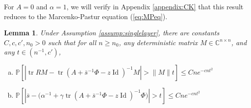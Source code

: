 \documentclass{article}
\newtheorem{lemma}[theorem]{Lemma}
\theoremstyle{definition}
\newcommand{\C}{\mathbb{C}}
\newcommand{\Id}{\operatorname{Id}}
\newcommand{\tr}{\operatorname{tr}}
\renewcommand{\P}{\mathbb{P}}
\newcommand{\1}{\mathbf{1}}
\begin{document}
For $A=0$ and $\alpha=1$, we will verify in Appendix \ref{appendix:CK}
that this result reduces to the Marcenko-Pastur equation (\ref{eq:MPeq}).

\begin{lemma}\label{lemma:fixedpoint}
Under Assumption \ref{assump:singlelayer},
there are constants $C,c,c',n_0>0$ such that for all $n \geq n_0$,
any deterministic matrix $M \in \C^{n \times n}$, and any $t \in (n^{-1},c')$,
\begin{enumerate}[(a)]
\item 
$\displaystyle \P\left[\left|\tr RM-\tr \left(A+\bar{s}^{-1}\Phi-z\Id\right)^{-1}M\right|
>\|M\|t\right] \leq Cne^{-cnt^2}$
\item 
$\displaystyle \P\left[\left|\bar{s}-\big(\alpha^{-1}+\gamma
\tr \left(A+\bar{s}^{-1} \Phi-z\Id\right)^{-1}\Phi\big)\right|
>t\right] \leq Cne^{-cnt^2}$
\end{enumerate}
\end{lemma}
\end{document}
